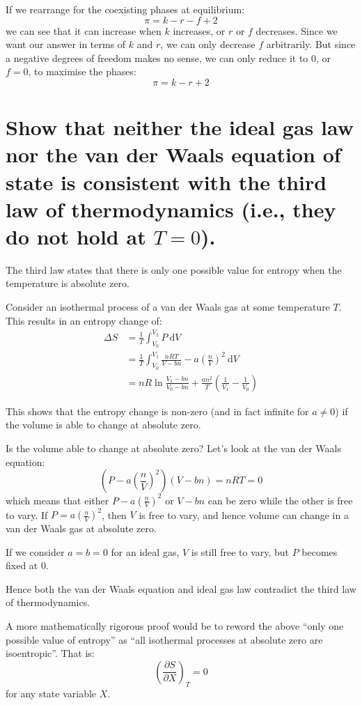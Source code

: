 \documentclass[a4paper]{scrartcl}
\begin{document}
If we rearrange for the coexisting phases at equilibrium:
\[\pi = k - r - f + 2\]
we can see that it can increase when \(k\) increases, or \(r\) or \(f\) decreases. Since we want our answer in terms of \(k\) and \(r\), we can only decrease \(f\) arbitrarily. But since a negative degrees of freedom makes no sense, we can only reduce it to 0, or \(f = 0\), to maximise the phases:
\[\pi = k - r + 2\]

\section{Show that neither the ideal gas law nor the van der Waals equation of state is consistent with the third law of thermodynamics (i.e., they do not hold at \(T = 0\)).}
The third law states that there is only one possible value for entropy when the temperature is absolute zero.

Consider an isothermal process of a van der Waals gas at some temperature \(T\). This results in an entropy change of:
\begin{align*}
    \Delta S &= \frac{1}{T} \int_{V_0}^{V_1} P \:\mathrm{d} V \\
    &= \frac{1}{T} \int_{V_0}^{V_1} \frac{n R T}{V - b n} - a \left(\frac{n}{V}\right)^2 \:\mathrm{d} V \\
    &= n R \ln \frac{V_1 - b n}{V_0 - b n} + \frac{a n^2}{T} \left(\frac{1}{V_1} - \frac{1}{V_0}\right)
\end{align*}

This shows that the entropy change is non-zero (and in fact infinite for \(a \ne 0\)) if the volume is able to change at absolute zero.

Is the volume able to change at absolute zero? Let's look at the van der Waals equation:
\[\left(P - a \left(\frac{n}{V}\right)^2\right)(V - b n) = n R T = 0\]
which means that either \(P - a \left(\frac{n}{V}\right)^2\) or \(V - b n\) can be zero while the other is free to vary. If \(P = a \left(\frac{n}{V}\right)^2\), then \(V\) is free to vary, and hence volume can change in a van der Waals gas at absolute zero.

If we consider \(a = b = 0\) for an ideal gas, \(V\) is still free to vary, but \(P\) becomes fixed at 0.

Hence both the van der Waals equation and ideal gas law contradict the third law of thermodynamics.

A more mathematically rigorous proof would be to reword the above ``only one possible value of entropy'' as ``all isothermal processes at absolute zero are isoentropic''. That is:
\[\left(\frac{\partial S}{\partial X}\right)_T = 0\]
for any state variable \(X\).
\end{document}
